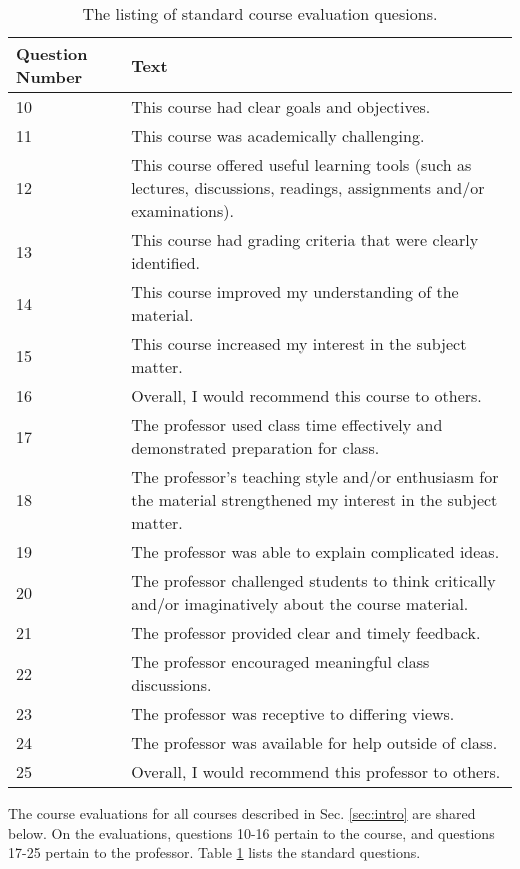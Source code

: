 \documentclass[../../main.tex]{subfiles}
\begin{document}
\begin{table}[ht]
\footnotesize
\centering
\begin{tabular}{| p{2cm} | p{12cm} |}
\hline
\hline
Question Number & Text \\ \hline
10 & This course had clear goals and objectives. \\ \hline
11 & This course was academically challenging. \\ \hline
12 & This course offered useful learning tools (such as lectures, discussions, readings, assignments and/or examinations). \\ \hline
13 & This course had grading criteria that were clearly identified. \\ \hline
14 & This course improved my understanding of the material. \\ \hline
15 & This course increased my interest in the subject matter. \\ \hline
16 & Overall, I would recommend this course to others. \\ \hline
17 & The professor used class time effectively and demonstrated preparation for class. \\ \hline
18 & The professor's teaching style and/or enthusiasm for the material strengthened my interest in the subject matter. \\ \hline
19 & The professor was able to explain complicated ideas. \\ \hline
20 & The professor challenged students to think critically and/or imaginatively about the course material. \\ \hline
21 & The professor provided clear and timely feedback. \\ \hline
22 & The professor encouraged meaningful class discussions. \\ \hline
23 & The professor was receptive to differing views. \\ \hline
24 & The professor was available for help outside of class. \\ \hline
25 & Overall, I would recommend this professor to others. \\ \hline
\hline
\end{tabular}
\caption{\label{tab:questions} The listing of standard course evaluation quesions.}
\end{table}

The course evaluations for all courses described in Sec. \ref{sec:intro} are shared below.  On the evaluations, questions 10-16 pertain to the course, and questions 17-25 pertain to the professor.  Table \ref{tab:questions} lists the standard questions.
\end{document}
